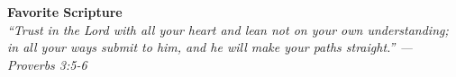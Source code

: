 \documentclass[10pt,a4paper]{article}
\begin{document}
\vfill

\begin{center}
  \color{gold}
  \vspace{6pt}
  {\color{burgundy}\small\bfseries Favorite Scripture} \\
  {\color{charcoal}\small\itshape “Trust in the Lord with all your heart and lean not on your own understanding; in all your ways submit to him, and he will make your paths straight.” --- Proverbs 3:5-6}
\end{center}
\end{document}

